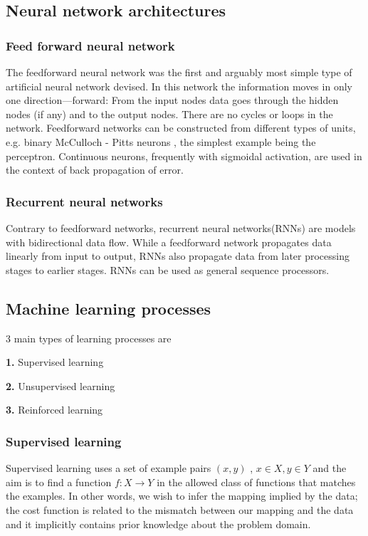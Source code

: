 \documentclass[12pt]{article}
\begin{document}
    \subsection{Neural network architectures}
    	\subsubsection{Feed forward neural network}
        The feedforward neural network was the first and arguably most simple type of artificial neural network devised. In this network the information moves in only one direction—forward: From the input nodes data goes through the hidden nodes  (if  any)  and  to  the  output  nodes.  There  are  no  cycles  or  loops  in  the  network.  Feedforward  networks  can  be constructed  from  different  types  of  units,  e.g.  binary McCulloch
-
Pitts  neurons
,  the  simplest  example  being  the 
perceptron. Continuous  neurons,  frequently  with  sigmoidal activation, are  used  in  the  context  of 
back  propagation
of error.
        \subsubsection{Recurrent neural networks}

        Contrary  to feedforward  networks, recurrent  neural  networks(RNNs)  are  models  with  bidirectional  data  flow. While  a  feedforward  network  propagates  data  linearly  from  input  to  output,  RNNs  also  propagate  data  from  later processing stages to earlier stages. RNNs can be used as general sequence processors.
    \subsection{Machine learning processes}
    3 main types of learning processes are 
    
       \qquad \textbf{1.} Supervised learning
       
       \qquad \textbf{2.} Unsupervised learning
       
       \qquad\textbf{3.} Reinforced learning
       
       
        \subsubsection{Supervised learning}
        Supervised learning uses a set of example pairs $(x,y)$ , $x \in X , y \in Y$ and the aim is to find a function $f : X \rightarrow Y $ in the allowed class of functions that matches the examples. In other words, we wish to infer the mapping implied by the data; the cost function is related to the mismatch between our mapping and the data and it implicitly contains prior knowledge about the problem domain.
\end{document}

